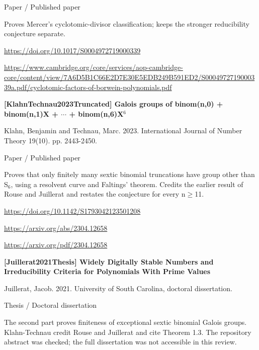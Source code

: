 \documentclass[11pt,a4paper,oneside,openany]{book}
\begin{document}
{\small\sffamily\color{atlasgold}Paper / Published paper}\par
\color{black} Proves Mercer's cyclotomic-divisor classification; keeps the stronger reducibility conjecture separate.\par
{\footnotesize\url{https://doi.org/10.1017/S0004972719000339}}\par
{\footnotesize\url{https://www.cambridge.org/core/services/aop-cambridge-core/content/view/7A6D5B1C66E2D7E30E5EDB249B591ED2/S0004972719000339a.pdf/cyclotomic-factors-of-borwein-polynomials.pdf}}\par
\vspace{9pt}
\hypertarget{ref:KlahnTechnau2023Truncated}{}
{\sffamily\bfseries\color{atlasgreen}[KlahnTechnau2023Truncated] Galois groups of binom(n,0) + binom(n,1)X + \ensuremath{\cdots} + binom(n,6)X\ensuremath{{}^6}}\par
\color{black} Klahn, Benjamin and Technau, Marc. 2023. International Journal of Number Theory 19(10). pp. 2443-2450.\par
{\small\sffamily\color{atlasgold}Paper / Published paper}\par
\color{black} Proves that only finitely many sextic binomial truncations have group other than S\ensuremath{{}_6}, using a resolvent curve and Faltings' theorem. Credits the earlier result of Rouse and Juillerat and restates the conjecture for every n\ensuremath{\ge}11.\par
{\footnotesize\url{https://doi.org/10.1142/S1793042123501208}}\par
{\footnotesize\url{https://arxiv.org/abs/2304.12658}}\par
{\footnotesize\url{https://arxiv.org/pdf/2304.12658}}\par
\vspace{9pt}
\hypertarget{ref:Juillerat2021Thesis}{}
{\sffamily\bfseries\color{atlasgreen}[Juillerat2021Thesis] Widely Digitally Stable Numbers and Irreducibility Criteria for Polynomials With Prime Values}\par
\color{black} Juillerat, Jacob. 2021. University of South Carolina, doctoral dissertation.\par
{\small\sffamily\color{atlasgold}Thesis / Doctoral dissertation}\par
\color{black} The second part proves finiteness of exceptional sextic binomial Galois groups. Klahn-Technau credit Rouse and Juillerat and cite Theorem 1.3. The repository abstract was checked; the full dissertation was not accessible in this review.\par
\end{document}
